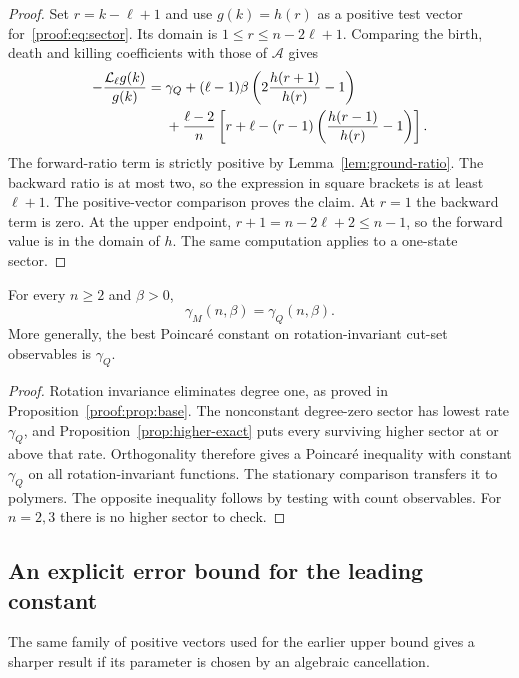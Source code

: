\begin{proof}
Set $r=k-\ell+1$ and use $g(k)=h(r)$ as a positive test vector
for~\eqref{proof:eq:sector}. Its domain is
$1\le r\le n-2\ell+1$. Comparing the birth, death and killing
coefficients with those of $\mathcal A$ gives
\begin{align}
 -\frac{\mathcal L_\ell g(k)}{g(k)}
 ={}&\gamma_Q
 +(\ell-1)\beta\left(2\frac{h(r+1)}{h(r)}-1\right)\notag\\
 &+\frac{\ell-2}{n}
 \left[r+\ell-(r-1)\left(\frac{h(r-1)}{h(r)}-1\right)\right].
 \label{eq:higher-exact-certificate}
\end{align}
The forward-ratio term is strictly positive by
Lemma~\ref{lem:ground-ratio}. The backward ratio is at most two,
so the expression in square brackets is at least $\ell+1$.
The positive-vector comparison proves the claim. At $r=1$ the
backward term is zero. At the upper endpoint,
$r+1=n-2\ell+2\le n-1$, so the forward value is in the domain
of $h$. The same computation applies to a one-state sector.
\end{proof}

\begin{theorem}\label{thm:exact-gap}
For every $n\ge2$ and $\beta>0$,
\[
 \boxed{\gamma_M(n,\beta)=\gamma_Q(n,\beta).}
\]
More generally, the best Poincar\'e constant on rotation-invariant
cut-set observables is $\gamma_Q$.
\end{theorem}

\begin{proof}
Rotation invariance eliminates degree one, as proved in
Proposition~\ref{proof:prop:base}. The nonconstant degree-zero
sector has lowest rate $\gamma_Q$, and
Proposition~\ref{prop:higher-exact} puts every surviving higher
sector at or above that rate. Orthogonality therefore gives a
Poincar\'e inequality with constant $\gamma_Q$ on all
rotation-invariant functions. The stationary comparison transfers
it to polymers. The opposite inequality follows by testing with
count observables. For $n=2,3$ there is no higher sector to check.
\end{proof}

\subsection{An explicit error bound for the leading constant}

The same family of positive vectors used for the earlier upper
bound gives a sharper result if its parameter is chosen by an
algebraic cancellation.

